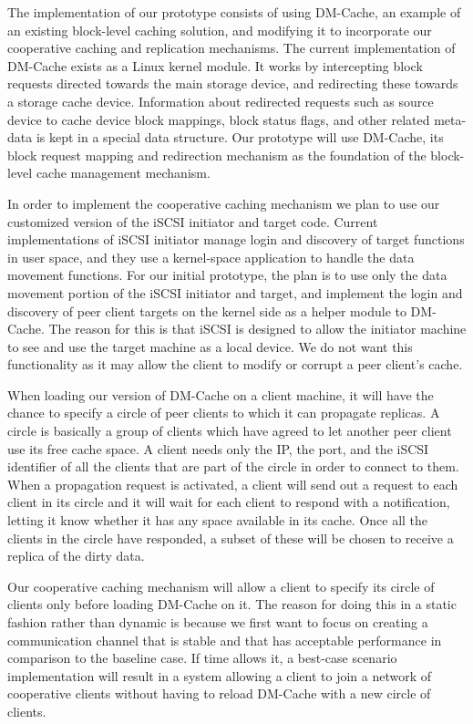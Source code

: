 The implementation of our prototype consists of using DM-Cache, an example of an existing block-level caching solution, and modifying it to incorporate our cooperative caching and replication mechanisms. The current implementation of DM-Cache exists as a Linux kernel module. It works by intercepting block requests directed towards the main storage device, and redirecting these towards a storage cache device. Information about redirected requests such as source device to cache device block mappings, block status flags, and other related meta-data is kept in a special data structure. Our prototype will use DM-Cache, its block request mapping and redirection mechanism as the foundation of the block-level cache management mechanism.

In order to implement the cooperative caching mechanism we plan to use our customized version of the iSCSI initiator and target code. Current implementations of iSCSI initiator manage login and discovery of target functions in user space, and they use a kernel-space application to handle the data movement functions. For our initial prototype, the plan is to use only the data movement portion of the iSCSI initiator and target, and implement the login and discovery of peer client targets on the kernel side as a helper module to DM-Cache. The reason for this is that iSCSI is designed to allow the initiator machine to see and use the target machine as a local device. We do not want this functionality as it may allow the client to modify or corrupt a peer client's cache.

When loading our version of DM-Cache on a client machine, it will have the chance to specify a circle of peer clients to which it can propagate replicas. A circle is basically a group of clients which have agreed to let another peer client use its free cache space. A client needs only the IP, the port, and the iSCSI identifier of all the clients that are part of the circle in order to connect to them. When a propagation request is activated, a client will send out a request to each client in its circle and it will wait for each client to respond with a notification, letting it know whether it has any space available in its cache. Once all the clients in the circle have responded, a subset of these will be chosen to receive a replica of the dirty data.

Our cooperative caching mechanism will allow a client to specify its circle of clients only before loading DM-Cache on it. The reason for doing this in a static fashion rather than dynamic is because we first want to focus on creating a communication channel that is stable and that has acceptable performance in comparison to the baseline case. If time allows it, a best-case scenario implementation will result in a system allowing a client to join a network of cooperative clients without having to reload DM-Cache with a new circle of clients.

